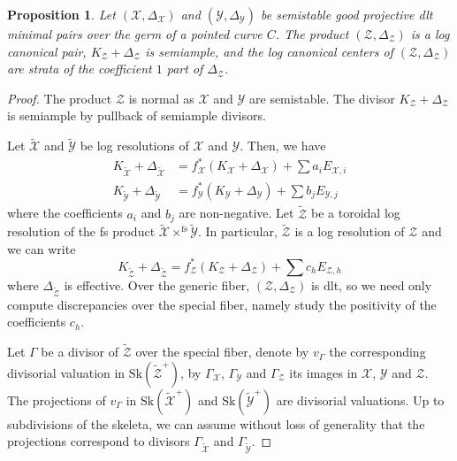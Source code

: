 \documentclass{amsart}%
\numberwithin{equation}{subsection}
\theoremstyle{plain2}
\newtheorem{prop}[equation]{Proposition}
\theoremstyle{definition2}
\theoremstyle{stepstyle}
\theoremstyle{point}
\theoremstyle{subpoint}
\newcommand{\cX}{\ensuremath{\mathscr{X}}}
\newcommand{\cY}{\ensuremath{\mathscr{Y}}}
\newcommand{\cZ}{\ensuremath{\mathscr{Z}}}
\renewcommand{\cY}{\ensuremath{\mathscr{Y}}}
\newcommand{\Sk}{\mathrm{Sk}}
\begin{document}
\begin{prop} \label{prop product of dlt minimal pairs}
Let $(\cX,\Delta_{\cX})$ and $(\cY,\Delta_{\cY})$ be semistable good projective dlt minimal pairs over the germ of a pointed curve $C$. The product $(\cZ,\Delta_{\cZ})$ is a log canonical pair, $K_\cZ+\Delta_{\cZ}$ is semiample, and the log canonical centers of $(\cZ,\Delta_{\cZ})$ are strata of the coefficient $1$ part of $\Delta_{\cZ}$.
\end{prop}

\begin{proof}
The product $\cZ$ is normal as $\cX$ and $\cY$ are semistable. The divisor $K_\cZ+\Delta_{\cZ}$ is semiample by pullback of semiample divisors.

Let $\widetilde{\cX}$ and $\widetilde{\cY}$ be log resolutions of $\cX$ and $\cY$. Then, we have 
\begin{align*}
K_{\widetilde{\cX}}+ \Delta_{\widetilde{\cX}}&= f_\cX^*(K_\cX + \Delta_{\cX}) + \sum a_i E_{\cX,i} \\
K_{\widetilde{\cY}}+ \Delta_{\widetilde{\cY}}&= f_\cY^*(K_\cY + \Delta_{\cY}) + \sum b_j E_{\cY,j}
\end{align*} where the coefficients $a_i$ and $b_j$ are non-negative. Let $\widetilde{\cZ}$ be a toroidal log resolution of the fs product $\widetilde{\cX} \times^{\text{fs}} \widetilde{\cY}$. In particular, $\widetilde{\cZ}$ is a log resolution of $\cZ$ and we can write $$K_{\widetilde{\cZ}}+ \Delta_{\widetilde{\cZ}}= f_\cZ^*(K_\cZ + \Delta_{\cZ}) + \sum c_h E_{\cZ,h}$$ where $\Delta_{\widetilde{\cZ}}$ is effective. Over the generic fiber, $(\cZ,\Delta_{\cZ})$ is dlt, so we need only compute discrepancies over the special fiber, namely study the positivity of the coefficients $c_h$. 

Let $\Gamma$ be a divisor of $\widetilde{\cZ}$ over the special fiber, denote by $v_\Gamma$ the corresponding divisorial valuation in $\Sk(\widetilde{\cZ}^+)$, by $\Gamma_\cX$, $\Gamma_\cY$ and $\Gamma_{\cZ}$ its images in $\cX$, $\cY$ and $\cZ$. The projections of $v_\Gamma$ in $\Sk(\widetilde{\cX}^+)$ and $\Sk(\widetilde{\cY}^+)$ are divisorial valuations. Up to subdivisions of the skeleta, we can assume without loss of generality that the projections correspond to divisors $\Gamma_{\widetilde{\cX}}$ and $\Gamma_{\widetilde{\cY}}$.


\end{proof}
\end{document}
